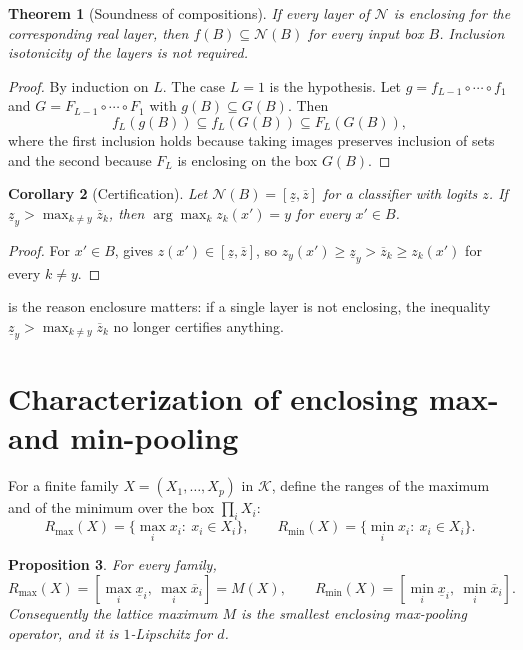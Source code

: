 \documentclass[preprint,12pt]{elsarticle}
\newtheorem{theorem}{Theorem}[section]
\newtheorem{proposition}[theorem]{Proposition}
\newtheorem{corollary}[theorem]{Corollary}
\theoremstyle{definition}
\newcommand{\K}{\mathcal{K}}
\newcommand{\lo}[1]{\underline{#1}}
\newcommand{\up}[1]{\overline{#1}}
\begin{document}
\begin{theorem}[Soundness of compositions]\label{thm:net}
If every layer of $\mathcal N$ is enclosing for the corresponding real layer, then $f(B)\subseteq\mathcal N(B)$ for every input box $B$. Inclusion isotonicity of the layers is not required.
\end{theorem}

\begin{proof}
By induction on $L$. The case $L=1$ is the hypothesis. Let $g=f_{L-1}\circ\cdots\circ f_1$ and $G=F_{L-1}\circ\cdots\circ F_1$ with $g(B)\subseteq G(B)$. Then
\[
f_L(g(B))\subseteq f_L(G(B))\subseteq F_L(G(B)),
\]
where the first inclusion holds because taking images preserves inclusion of sets and the second because $F_L$ is enclosing on the box $G(B)$.
\end{proof}

\begin{corollary}[Certification]\label{cor:cert}
Let $\mathcal N(B)=[\lo z,\up z]$ for a classifier with logits $z$. If $\lo z_y>\max_{k\ne y}\up z_k$, then $\arg\max_kz_k(x')=y$ for every $x'\in B$.
\end{corollary}

\begin{proof}
For $x'\in B$,  gives $z(x')\in[\lo z,\up z]$, so $z_y(x')\ge\lo z_y>\up z_k\ge z_k(x')$ for every $k\ne y$.
\end{proof}

 is the reason enclosure matters: if a single layer is not enclosing, the inequality $\lo z_y>\max_{k\ne y}\up z_k$ no longer certifies anything.

\section{Characterization of enclosing max- and min-pooling}
\label{sec:char}

For a finite family $X=(X_1,\dots,X_p)$ in $\K$, define the ranges of the maximum and of the minimum over the box $\prod_iX_i$:
\[
R_{\max}(X)=\{\max_ix_i:\ x_i\in X_i\},\qquad R_{\min}(X)=\{\min_ix_i:\ x_i\in X_i\}.
\]

\begin{proposition}\label{prop:lattice}
For every family,
\[
R_{\max}(X)=[\max_i\lo x_i,\ \max_i\up x_i]=M(X),\qquad R_{\min}(X)=[\min_i\lo x_i,\ \min_i\up x_i].
\]
Consequently the lattice maximum $M$ is the smallest enclosing max-pooling operator, and it is $1$-Lipschitz for $d$.
\end{proposition}
\end{document}

